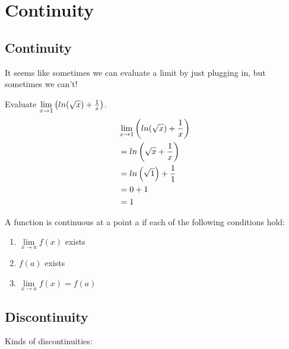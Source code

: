 \chapter{Continuity}

\section{Continuity}

It seems like sometimes we can evaluate a limit by just plugging in, but sometimes we can't! \\

\begin{exercise}\nonumber
	Evaluate $ \lim\limits_{x \rightarrow 1}\left(ln(\sqrt{x}) + {1 \over x}\right) $. \\
	\begin{align}
		 & \lim\limits_{x \rightarrow 1}\left(ln(\sqrt{x}) + {1 \over x}\right) \\
		 & = ln\left(\sqrt{x} + {1 \over x}\right)                              \\
		 & = ln\left(\sqrt{1}\right) + {1 \over 1}                              \\
		 & = 0 + 1                                                              \\
		 & = 1
	\end{align}
\end{exercise}

A function is continuous at a point a if each of the following conditions hold: \\

\begin{enumerate}
	\item
	      $ \lim\limits_{x \rightarrow a}f(x) $ exists \\

	\item
	      $ f(a) $ exists \\

	\item
	      $ \lim\limits_{x \rightarrow a}f(x) = f(a) $ \\
\end{enumerate}

\section{Discontinuity}

Kinds of discontinuities: \\

